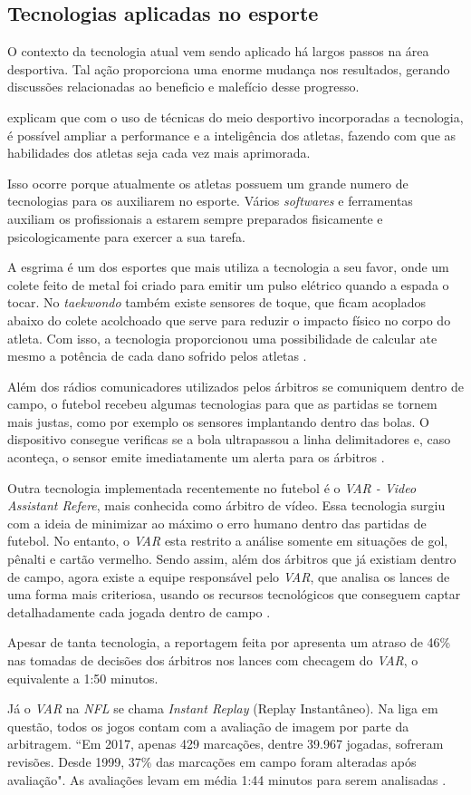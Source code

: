 \subsection{Tecnologias aplicadas no esporte}

O contexto da tecnologia atual vem sendo aplicado há largos passos na área desportiva. Tal ação proporciona uma enorme mudança nos resultados, gerando discussões relacionadas ao beneficio e malefício desse progresso.

 explicam que com o uso de técnicas do meio desportivo incorporadas a tecnologia, é possível ampliar a performance e a inteligência dos atletas, fazendo com que as habilidades dos atletas seja cada vez mais aprimorada.

Isso ocorre porque atualmente os atletas possuem um grande numero de tecnologias para os auxiliarem no esporte. Vários \textit{softwares} e ferramentas auxiliam os profissionais a estarem sempre preparados fisicamente e psicologicamente para exercer a sua tarefa.

A esgrima é um dos esportes que mais utiliza a tecnologia a seu favor, onde um colete feito de metal foi criado para emitir um pulso elétrico quando a espada o tocar. No \textit{taekwondo} também existe sensores de toque, que ficam acoplados abaixo do colete acolchoado que serve para reduzir o impacto físico no corpo do atleta. Com isso, a tecnologia proporcionou uma possibilidade de calcular ate mesmo a potência de cada dano sofrido pelos atletas \cite{SCHATTENBERG2013}.

Além dos rádios comunicadores utilizados pelos árbitros se comuniquem dentro de campo, o futebol recebeu algumas tecnologias para que as partidas se tornem mais justas, como por exemplo os sensores implantando dentro das bolas. O dispositivo consegue verificas se a bola ultrapassou a linha delimitadores e, caso aconteça, o sensor emite imediatamente um alerta para os árbitros \cite{G12012}.

Outra tecnologia implementada recentemente no futebol é o \textit{VAR - Video Assistant Refere}, mais conhecida como árbitro de vídeo. Essa tecnologia surgiu com a ideia de minimizar ao máximo o erro humano dentro das partidas de futebol. No entanto, o \textit{VAR} esta restrito a análise somente em situações de gol, pênalti e cartão vermelho. Sendo assim, além dos árbitros que já existiam dentro de campo, agora existe a equipe responsável pelo \textit{VAR}, que analisa os lances de uma forma mais criteriosa, usando os recursos tecnológicos que conseguem captar detalhadamente cada jogada dentro de campo \cite{CANALTECH2019}.

Apesar de tanta tecnologia, a reportagem feita por  apresenta um atraso de 46\% nas tomadas de decisões dos árbitros  nos lances com checagem do \textit{VAR}, o equivalente a 1:50 minutos.

Já o \textit{VAR} na \textit{NFL} se chama \textit{Instant Replay} (Replay Instantâneo). Na liga em questão, todos os jogos contam com a avaliação de imagem por parte da arbitragem. “Em 2017, apenas 429 marcações, dentre 39.967 jogadas, sofreram revisões. Desde 1999, 37\% das marcações em campo foram alteradas após avaliação". As avaliações levam em média 1:44 minutos para serem analisadas \cite{VARESPN2018}.
